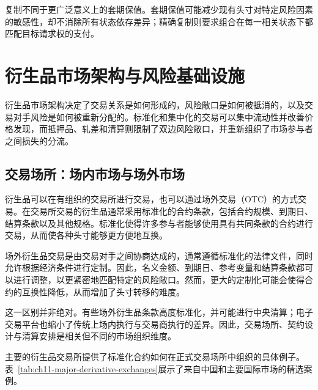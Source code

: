 复制不同于更广泛意义上的套期保值。套期保值可能减少现有头寸对特定风险因素的敏感性，却不消除所有状态依存差异；精确复制则要求组合在每一相关状态下都匹配目标请求权的支付。

\section{衍生品市场架构与风险基础设施}

衍生品市场架构决定了交易关系是如何形成的，风险敞口是如何被抵消的，以及交易对手风险是如何被重新分配的。标准化和集中化的交易可以集中流动性并改善价格发现，而抵押品、轧差和清算则限制了双边风险敞口，并重新组织了市场参与者之间损失的分流。

\subsection{交易场所：场内市场与场外市场}

衍生品可以在有组织的交易所进行交易，也可以通过场外交易（OTC）的方式交易。在交易所交易的衍生品通常采用标准化的合约条款，包括合约规模、到期日、结算条款以及其他规格。标准化使得许多参与者能够使用具有共同条款的合约进行交易，从而使各种头寸能够更方便地互换。

场外衍生品交易是由交易对手之间协商达成的，通常遵循标准化的法律文件，同时允许根据经济条件进行定制。因此，名义金额、到期日、参考变量和结算条款都可以进行调整，以更紧密地匹配特定的风险敞口。然而，更大的定制化可能会使得合约的互换性降低，从而增加了头寸转移的难度。

这一区别并非绝对。有些场外衍生品条款高度标准化，并可能进行中央清算；电子交易平台也缩小了传统上场内执行与交易商执行的差异。因此，交易场所、契约设计与清算安排是相关但不同的市场组织维度。

主要的衍生品交易所提供了标准化合约如何在正式交易场所中组织的具体例子。表~\ref{tab:ch11-major-derivative-exchanges}展示了来自中国和主要国际市场的精选案例。

